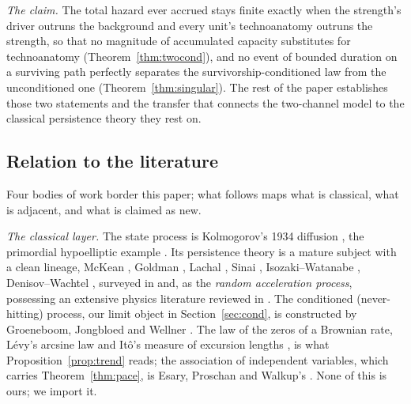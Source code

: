 \emph{The claim.} The total hazard ever accrued stays finite exactly when
the strength's driver outruns the background and every unit's
technoanatomy outruns the strength, so that no magnitude of accumulated
capacity substitutes for technoanatomy (Theorem~\ref{thm:twocond}), and no
event of bounded duration on a
surviving path perfectly separates the survivorship-conditioned law
from the unconditioned one (Theorem~\ref{thm:singular}). The rest of the
paper establishes those two statements and the transfer that connects
the two-channel model to the classical persistence theory they rest
on.

\subsection{Relation to the literature}
Four bodies of work border this paper; what follows maps what is
classical, what is adjacent, and what is claimed as new.

\emph{The classical layer.} The state process is Kolmogorov's 1934
diffusion \cite{Kol34}, the primordial hypoelliptic example
\cite{Hor67}. Its persistence theory is a mature subject with a clean
lineage, McKean \cite{McK63}, Goldman \cite{Gol71}, Lachal
\cite{Lac91}, Sinai \cite{Sin92}, Isozaki--Watanabe \cite{IW94},
Denisov--Wachtel \cite{DW15}, surveyed in \cite{AS15} and, as the
\emph{random acceleration process}, possessing an extensive physics
literature reviewed in \cite{BMS13}. The conditioned (never-hitting)
process, our limit object in Section~\ref{sec:cond}, is constructed by
Groeneboom, Jongbloed and Wellner \cite{GJW99}. The law of the zeros of a
Brownian rate, L\'evy's arcsine law and It\^o's measure of excursion
lengths \cite{RY99}, is what Proposition~\ref{prop:trend} reads; the association of independent variables, which carries Theorem~\ref{thm:pace}, is Esary, Proschan and Walkup's \cite{EPW67}. None of
this is ours; we import it.

